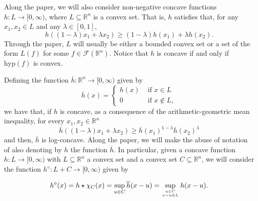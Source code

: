 \documentclass{amsart}
\newcommand{\R}{\mathbb R}
\theoremstyle{remark}
\theoremstyle{definition}
\numberwithin{equation}{section}
\begin{document}
Along the paper, we will also consider non-negative concave functions $h:L\to[0,\infty)$, where $L\subseteq\R^n$ is a convex set. That is, $h$ satisfies that, for any $x_1,x_2\in L$ and any $\lambda\in[0,1]$,
$$
h((1-\lambda)x_1+\lambda x_2)\geq (1-\lambda)h(x_1)+\lambda h(x_2).
$$
Through the paper, $L$ will usually be either a bounded convex set or a set of the form $L(f)$ for some $f\in\mathcal{F}(\R^n)$. Notice that $h$ is concave if and only if $\textrm{hyp}(f)$ is convex.

Defining the function $\overline{h}:\R^n\to[0,\infty)$ given by
$$
\overline{h}(x)=\begin{cases}
h(x) &\textrm{ if }x\in L\\
0 &\textrm{ if }x\not\in L,
\end{cases}
$$
we have that, if $h$ is concave, as a consequence of the arithmetic-geometric mean inequality, for every $x_1,x_2\in\R^n$
$$
\overline{h}((1-\lambda)x_1+\lambda x_2)\geq \overline{h}(x_1)^{1-\lambda}\overline{h}(x_2)^\lambda
$$
and then, $\overline{h}$ is log-concave. Along the paper, we will make the abuse of notation of also denoting by $h$ the function $\overline{h}$. In particular, given a concave function $h:L\to[0,\infty)$ with $L\subseteq\R^n$ a convex set and a convex set $C\subseteq\R^n$, we will consider the function $h^\diamond:L+C\to[0,\infty)$ given by

\begin{equation}\label{eq:DefinitionfDiamond}
h^\diamond(x)=h\star\chi_C(x)=\sup_{u\in C}\overline{h}(x-u)=\sup_{u\in C\atop x-u\in L}h(x-u).
\end{equation}
\end{document}
